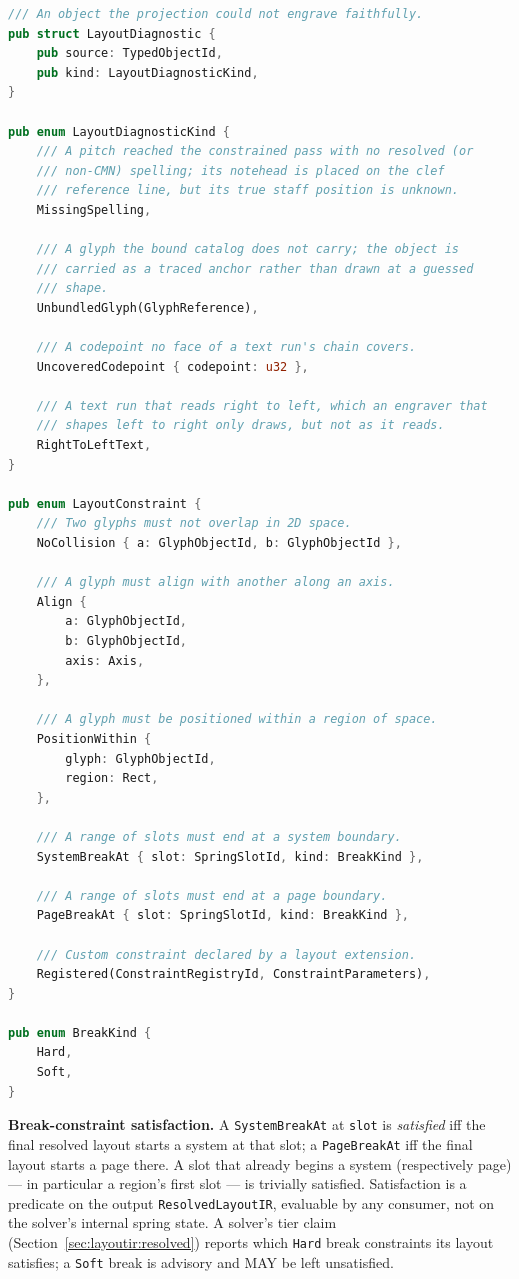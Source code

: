 \documentclass[11pt,letterpaper]{report}
\newcounter{requirement}[chapter]
\begin{document}
\begin{lstlisting}[language=Rust]
/// An object the projection could not engrave faithfully.
pub struct LayoutDiagnostic {
    pub source: TypedObjectId,
    pub kind: LayoutDiagnosticKind,
}

pub enum LayoutDiagnosticKind {
    /// A pitch reached the constrained pass with no resolved (or
    /// non-CMN) spelling; its notehead is placed on the clef
    /// reference line, but its true staff position is unknown.
    MissingSpelling,

    /// A glyph the bound catalog does not carry; the object is
    /// carried as a traced anchor rather than drawn at a guessed
    /// shape.
    UnbundledGlyph(GlyphReference),

    /// A codepoint no face of a text run's chain covers.
    UncoveredCodepoint { codepoint: u32 },

    /// A text run that reads right to left, which an engraver that
    /// shapes left to right only draws, but not as it reads.
    RightToLeftText,
}

pub enum LayoutConstraint {
    /// Two glyphs must not overlap in 2D space.
    NoCollision { a: GlyphObjectId, b: GlyphObjectId },

    /// A glyph must align with another along an axis.
    Align {
        a: GlyphObjectId,
        b: GlyphObjectId,
        axis: Axis,
    },

    /// A glyph must be positioned within a region of space.
    PositionWithin {
        glyph: GlyphObjectId,
        region: Rect,
    },

    /// A range of slots must end at a system boundary.
    SystemBreakAt { slot: SpringSlotId, kind: BreakKind },

    /// A range of slots must end at a page boundary.
    PageBreakAt { slot: SpringSlotId, kind: BreakKind },

    /// Custom constraint declared by a layout extension.
    Registered(ConstraintRegistryId, ConstraintParameters),
}

pub enum BreakKind {
    Hard,
    Soft,
}
\end{lstlisting}

\begin{requirement}
  \label{req:layoutir:break-satisfaction}
  \textbf{Break-constraint satisfaction.} A \texttt{SystemBreakAt} at
  \texttt{slot} is \emph{satisfied} iff the final resolved layout starts a
  system at that slot; a \texttt{PageBreakAt} iff the final layout starts a page
  there. A slot that already begins a system (respectively page) --- in
  particular a region's first slot --- is trivially satisfied. Satisfaction is a
  predicate on the output \texttt{ResolvedLayoutIR}, evaluable by any consumer,
  not on the solver's internal spring state. A solver's tier claim
  (Section~\ref{sec:layoutir:resolved}) reports which \texttt{Hard} break
  constraints its layout satisfies; a \texttt{Soft} break is advisory and MAY be
  left unsatisfied.
\end{requirement}
\end{document}
